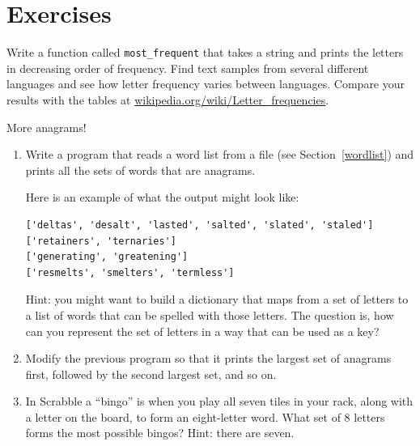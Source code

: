 \documentclass[10pt]{book}
\begin{document}
{\begin{description}
\end{description}


\section{Exercises}
\begin{ex}
Write a function called \verb"most_frequent" that takes a string and
prints the letters in decreasing order of frequency.  Find text
samples from several different languages and see how letter frequency
varies between languages.  Compare your results with the tables at
\url{wikipedia.org/wiki/Letter_frequencies}.


\end{ex}


\begin{ex}
\label{anagrams}


More anagrams!

\begin{enumerate}

\item Write a program
that reads a word list from a file (see Section~\ref{wordlist}) and
prints all the sets of words that are anagrams.

Here is an example of what the output might look like:

\beforeverb
\begin{verbatim}
['deltas', 'desalt', 'lasted', 'salted', 'slated', 'staled']
['retainers', 'ternaries']
['generating', 'greatening']
['resmelts', 'smelters', 'termless']
\end{verbatim}
\afterverb
%
Hint: you might want to build a dictionary that maps from a
set of letters to a list of words that can be spelled with those
letters.  The question is, how can you represent the set of
letters in a way that can be used as a key?

\item Modify the previous program so that it prints the largest set
of anagrams first, followed by the second largest set, and so on.


\item In Scrabble a ``bingo'' is when you play all seven tiles in
your rack, along with a letter on the board, to form an eight-letter
word.  What set of 8 letters forms the most possible bingos?
Hint: there are seven.


\end{enumerate}
\end{ex}}
\end{document}
